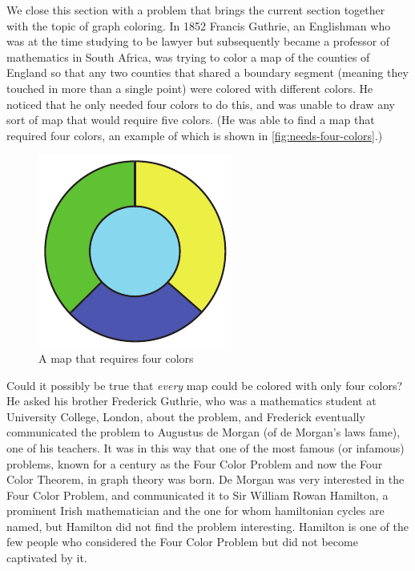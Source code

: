 We close this section with a problem that brings the current section
together with the topic of graph coloring. In 1852 Francis Guthrie, an
Englishman who was at the time studying to be lawyer but subsequently
became a professor of mathematics in South Africa, was trying to color
a map of the counties of England so that any two counties that shared
a boundary segment (meaning they touched in more than a single point)
were colored with different colors. He noticed that he only needed
four colors to do this, and was unable to draw any sort of map that
would require five colors. (He was able to find a map that required
four colors, an example of which is shown in
\autoref{fig:needs-four-colors}.)
\begin{figure}
  \centering
  \includegraphics{graphs-figs/needs_four_colors}
  \caption{A map that requires four colors}
  \label{fig:needs-four-colors}
\end{figure}
Could it possibly be true that \emph{every} map could be colored with
only four colors? He asked his brother Frederick Guthrie, who was a
mathematics student at University College, London, about the problem,
and Frederick eventually communicated the problem to Augustus de
Morgan (of de Morgan's laws fame), one of his teachers. It was in this
way that one of the most famous (or infamous) problems, known for a
century as the Four Color Problem and now the Four Color Theorem, in
graph theory was born. De Morgan was very interested in the Four Color
Problem, and communicated it to Sir William Rowan Hamilton,  a
prominent Irish mathematician and the one for whom hamiltonian
cycles are named, but Hamilton did not find the problem
interesting. Hamilton is one of the few people who considered the Four
Color Problem but did not become captivated by it.

